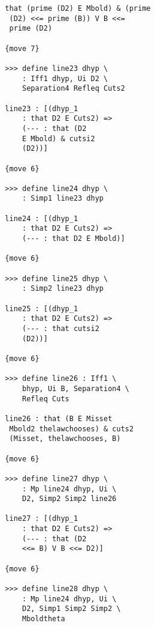 \documentclass[12pt]{article}
\begin{document}
\begin{verbatim}
                     that (prime (D2) E Mbold) & (prime 
                      (D2) <<= prime (B)) V B <<= 
                      prime (D2)

                     {move 7}

                     >>> define line23 dhyp \
                         : Iff1 dhyp, Ui D2 \
                         Separation4 Refleq Cuts2

                     line23 : [(dhyp_1 
                         : that D2 E Cuts2) => 
                         (--- : that (D2 
                         E Mbold) & cutsi2 
                         (D2))]

                     {move 6}

                     >>> define line24 dhyp \
                         : Simp1 line23 dhyp

                     line24 : [(dhyp_1 
                         : that D2 E Cuts2) => 
                         (--- : that D2 E Mbold)]

                     {move 6}

                     >>> define line25 dhyp \
                         : Simp2 line23 dhyp

                     line25 : [(dhyp_1 
                         : that D2 E Cuts2) => 
                         (--- : that cutsi2 
                         (D2))]

                     {move 6}

                     >>> define line26 : Iff1 \
                         bhyp, Ui B, Separation4 \
                         Refleq Cuts

                     line26 : that (B E Misset 
                      Mbold2 thelawchooses) & cuts2 
                      (Misset, thelawchooses, B)

                     {move 6}

                     >>> define line27 dhyp \
                         : Mp line24 dhyp, Ui \
                         D2, Simp2 Simp2 line26

                     line27 : [(dhyp_1 
                         : that D2 E Cuts2) => 
                         (--- : that (D2 
                         <<= B) V B <<= D2)]

                     {move 6}

                     >>> define line28 dhyp \
                         : Mp line24 dhyp, Ui \
                         D2, Simp1 Simp2 Simp2 \
                         Mboldtheta


\end{verbatim}
\end{document}
